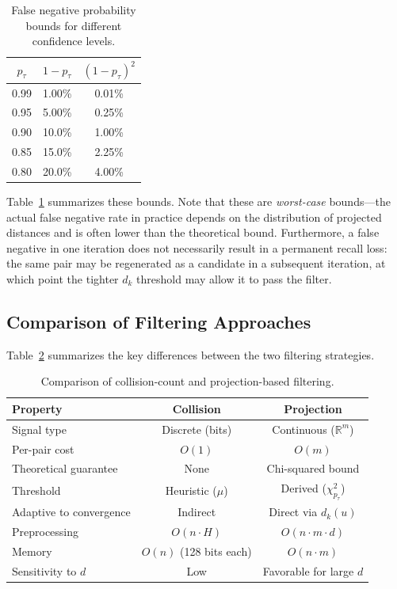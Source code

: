 \begin{table}[t]
\centering
\caption{False negative probability bounds for different confidence levels.}
\label{tab:fn_prob}
\begin{tabular}{ccc}
\toprule
$p_\tau$ & $1 - p_\tau$ & $(1 - p_\tau)^2$ \\
\midrule
0.99 & 1.00\% & 0.01\% \\
0.95 & 5.00\% & 0.25\% \\
0.90 & 10.0\% & 1.00\% \\
0.85 & 15.0\% & 2.25\% \\
0.80 & 20.0\% & 4.00\% \\
\bottomrule
\end{tabular}
\end{table}

Table~\ref{tab:fn_prob} summarizes these bounds.
Note that these are \emph{worst-case} bounds---the actual false negative rate in practice depends on the distribution of projected distances and is often lower than the theoretical bound.
Furthermore, a false negative in one iteration does not necessarily result in a permanent recall loss: the same pair may be regenerated as a candidate in a subsequent iteration, at which point the tighter $d_k$ threshold may allow it to pass the filter.

\subsection{Comparison of Filtering Approaches}
\label{sec:filter_comparison}

Table~\ref{tab:filter_comparison} summarizes the key differences between the two filtering strategies.

\begin{table}[t]
\centering
\caption{Comparison of collision-count and projection-based filtering.}
\label{tab:filter_comparison}
\begin{tabular}{lcc}
\toprule
\textbf{Property} & \textbf{Collision} & \textbf{Projection} \\
\midrule
Signal type & Discrete (bits) & Continuous ($\mathbb{R}^m$) \\
Per-pair cost & $O(1)$ & $O(m)$ \\
Theoretical guarantee & None & Chi-squared bound \\
Threshold & Heuristic ($\mu$) & Derived ($\chi^2_{p_\tau}$) \\
Adaptive to convergence & Indirect & Direct via $d_k(u)$ \\
Preprocessing & $O(n \cdot H)$ & $O(n \cdot m \cdot d)$ \\
Memory & $O(n)$ (128 bits each) & $O(n \cdot m)$ \\
Sensitivity to $d$ & Low & Favorable for large $d$ \\
\bottomrule
\end{tabular}
\end{table}

